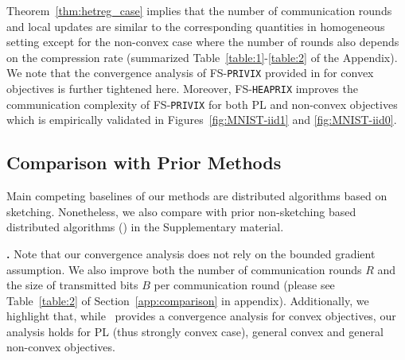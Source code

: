 \documentclass[sigconf, anonymous, review]{acmart}
\begin{document}
Theorem~\ref{thm:hetreg_case} implies that the number of communication rounds and local updates are similar to the corresponding quantities in homogeneous setting except for the non-convex case where the number of  rounds also depends on the compression rate (summarized Table~\ref{table:1}-\ref{table:2} of the Appendix). 
We note that the convergence analysis of FS-\texttt{PRIVIX} provided in \cite{li2019privacy} for convex objectives is further tightened here. 
Moreover, FS-\texttt{HEAPRIX} improves the communication complexity of FS-\texttt{PRIVIX} for both PL and non-convex objectives which is empirically validated in Figures~\ref{fig:MNIST-iid1} and \ref{fig:MNIST-iid0}.


\subsection{Comparison with Prior Methods} 

Main competing baselines of our methods are distributed algorithms based on sketching. 
Nonetheless, we also compare with prior non-sketching based distributed algorithms (\citep{karimireddy2019scaffold,basu2019qsparse,reisizadeh2020fedpaq,haddadpour2020federated}) in the Supplementary material.

\vspace{0.05in}
\noindent\textbf{\citet{li2019privacy}.} Note that our convergence analysis does not rely on the bounded gradient assumption. 
We also improve both the number of communication rounds $R$ and the size of transmitted bits $B$ per communication round (please see Table~\ref{table:2} of Section~\ref{app:comparison} in appendix).  
Additionally, we highlight that, while~\citep{li2019privacy} provides a convergence analysis for convex objectives, our analysis holds for PL (thus strongly convex case), general convex and general non-convex objectives.
\end{document}
